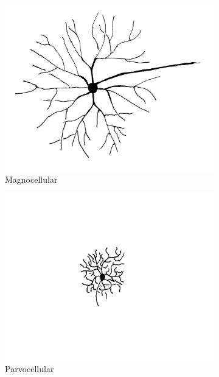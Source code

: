 \documentclass{pracalicmgr}
\begin{document}
   \begin{figure}[H]
   	\begin{subfigure}{.33\textwidth}
   		\centering
   		\includegraphics[width=1.\linewidth]{cell_M2.png}
   		\caption{Magnocellular}
   		\label{rys:magno}
   	\end{subfigure}%
   	\begin{subfigure}{.33\textwidth}
   		\centering
   		\includegraphics[width=1\linewidth]{cell_P2.png}
   		\caption{Parvocellular}
   		\label{rys:parvo}
   	\end{subfigure}
   	\begin{subfigure}{.33\textwidth}

\end{subfigure}
\end{figure}
\end{document}
